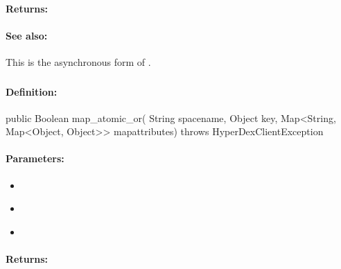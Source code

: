\paragraph{Returns:}


\paragraph{See also:}  This is the asynchronous form of .

\pagebreak
\subsubsection{}
\label{api:java:map_atomic_or}


\paragraph{Definition:}
\begin{javacode}
public Boolean map_atomic_or(
        String spacename,
        Object key,
        Map<String, Map<Object, Object>> mapattributes) throws HyperDexClientException
\end{javacode}

\paragraph{Parameters:}
\begin{itemize}[noitemsep]
\item {}\\

\item {}\\

\item {}\\

\end{itemize}

\paragraph{Returns:}



